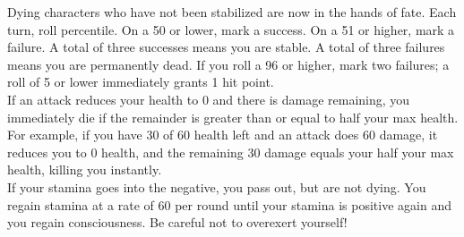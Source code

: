 Dying characters who have not been stabilized are now in the hands of fate. Each turn, roll percentile. On a 50 or lower, mark a success. On a 51 or higher, mark a failure. A total of three successes means you are stable. A total of three failures means you are permanently dead. If you roll a 96 or higher, mark two failures; a roll of 5 or lower immediately grants 1 hit point.\\

If an attack reduces your health to 0 and there is damage remaining, you immediately die if the remainder is greater than or equal to half your max health. For example, if you have 30 of 60 health left and an attack does 60 damage, it reduces you to 0 health, and the remaining 30 damage equals your half your max health, killing you instantly.\\

If your stamina goes into the negative, you pass out, but are not dying. You regain stamina at a rate of 60 per round until your stamina is positive again and you regain consciousness. Be careful not to overexert yourself!
